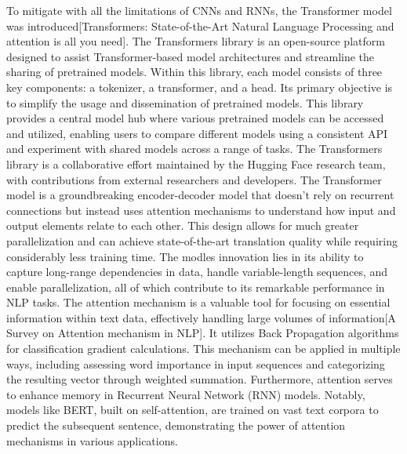 \documentclass[conference]{IEEEtran}
\begin{document}
To mitigate with all the limitations of CNNs and RNNs, the Transformer model was introduced[Transformers: State-of-the-Art Natural Language Processing and attention is all you need]. The Transformers library is an open-source platform designed to assist Transformer-based model architectures and streamline the sharing of pretrained models. Within this library, each model consists of three key components: a tokenizer, a transformer, and a head. Its primary objective is to simplify the usage and dissemination of pretrained models. This library provides a central model hub where various pretrained models can be accessed and utilized, enabling users to compare different models using a consistent API and experiment with shared models across a range of tasks. The Transformers library is a collaborative effort maintained by the Hugging Face research team, with contributions from external researchers and developers. The Transformer model is a groundbreaking encoder-decoder model that doesn't rely on recurrent connections but instead uses attention mechanisms to understand how input and output elements relate to each other. This design allows for much greater parallelization and can achieve state-of-the-art translation quality while requiring considerably less training time. The modles innovation lies in its ability to capture long-range dependencies in data, handle variable-length sequences, and enable parallelization, all of which contribute to its remarkable performance in NLP tasks. The attention mechanism is a valuable tool for focusing on essential information within text data, effectively handling large volumes of information[A Survey on Attention mechanism in NLP]. It utilizes Back Propagation algorithms for classification gradient calculations. This mechanism can be applied in multiple ways, including assessing word importance in input sequences and categorizing the resulting vector through weighted summation. Furthermore, attention serves to enhance memory in Recurrent Neural Network (RNN) models. Notably, models like BERT, built on self-attention, are trained on vast text corpora to predict the subsequent sentence, demonstrating the power of attention mechanisms in various applications.
\end{document}
